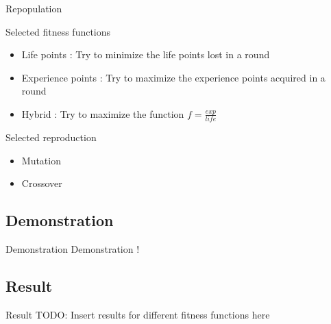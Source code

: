\begin{frame}{Repopulation}
  \begin{block}{Selected fitness functions}
    \begin{itemize}
    \item Life points : Try to minimize the life points lost in a round
    \item Experience points : Try to maximize the experience points acquired in a round
    \item Hybrid : Try to maximize the function $f = \frac{exp}{life} $
    \end{itemize}
  \end{block}

  \begin{block}{Selected reproduction}
    \begin{itemize}
    \item Mutation
    \item Crossover
    \end{itemize}
  \end{block}
\end{frame}

\subsection{Demonstration}

\begin{frame}{Demonstration}
  Demonstration !
\end{frame}

\subsection{Result}

\begin{frame}{Result}
  TODO: Insert results for different fitness functions here
\end{frame}
